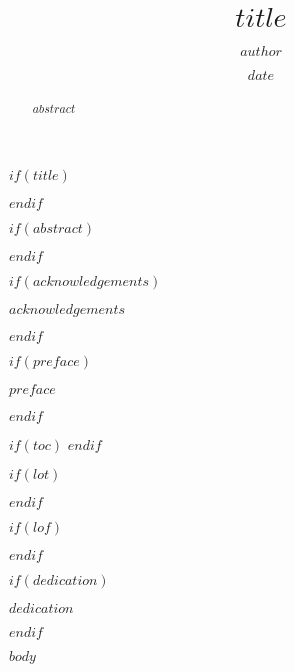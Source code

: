 \documentclass[letterpaper, 12pt, oneside]{gcdown}
\title{$title$}
\author{$author$}
\date{$date$}
\begin{document}

$if(title)$
  \maketitle
$endif$

\frontmatter
$if(abstract)$
\begin{abstract}
	$abstract$
\end{abstract}
$endif$

$if(acknowledgements)$
  \begin{acknowledgements}
    $acknowledgements$
  \end{acknowledgements}
$endif$

$if(preface)$
  \begin{preface}
    $preface$
  \end{preface}
$endif$

$if(toc)$
  \hypersetup{linkcolor=$if(toccolor)$$toccolor$$else$black$endif$}
  \setcounter{tocdepth}{$toc-depth$}
  \tableofcontents
$endif$

$if(lot)$
  \listoftables
$endif$

$if(lof)$
  \listoffigures
$endif$

$if(dedication)$
  \begin{dedication}
    $dedication$
  \end{dedication}
$endif$

\mainmatter
\pagestyle{fancyplain}
\fancyfoot[CO,CE]{\thepage}
$body$


\end{document}
